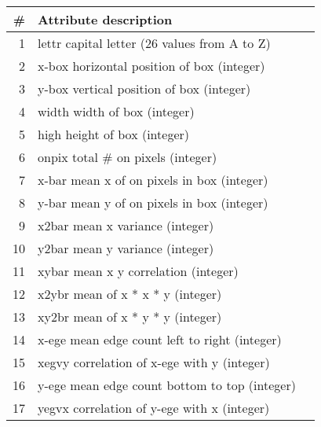 \begin{tabular}{rll}
\toprule
\# & Attribute description \\
\midrule
1 & lettr capital letter (26 values from A to Z)\\
2 & x-box horizontal position of box (integer)\\
3 & y-box vertical position of box (integer)\\
4 & width width of box (integer)\\
5 & high height of box (integer)\\
6 & onpix total \# on pixels (integer)\\
7 & x-bar mean x of on pixels in box (integer)\\
8 & y-bar mean y of on pixels in box (integer)\\
9 & x2bar mean x variance (integer)\\
10 & y2bar mean y variance (integer)\\
11 & xybar mean x y correlation (integer)\\
12 & x2ybr mean of x * x * y (integer)\\
13 & xy2br mean of x * y * y (integer)\\
14 & x-ege mean edge count left to right (integer)\\
15 & xegvy correlation of x-ege with y (integer)\\
16 & y-ege mean edge count bottom to top (integer)\\
17 & yegvx correlation of y-ege with x (integer)\\

\bottomrule
\end{tabular}